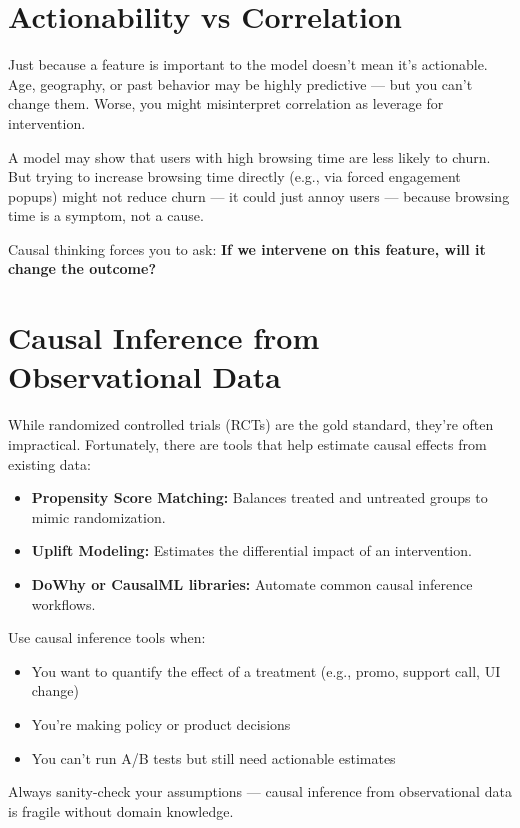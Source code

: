 \documentclass[12pt,openany, draft]{book}
\begin{document}
\section{Actionability vs Correlation}

Just because a feature is important to the model doesn't mean it's actionable. Age, geography, or past behavior may be highly predictive — but you can’t change them. Worse, you might misinterpret correlation as leverage for intervention.

\begin{examplebox}
A model may show that users with high browsing time are less likely to churn. But trying to increase browsing time directly (e.g., via forced engagement popups) might not reduce churn — it could just annoy users — because browsing time is a symptom, not a cause.
\end{examplebox}

Causal thinking forces you to ask: \textbf{If we intervene on this feature, will it change the outcome?}

\section{Causal Inference from Observational Data}

While randomized controlled trials (RCTs) are the gold standard, they’re often impractical. Fortunately, there are tools that help estimate causal effects from existing data:
\begin{itemize}
  \item \textbf{Propensity Score Matching:} Balances treated and untreated groups to mimic randomization.
  \item \textbf{Uplift Modeling:} Estimates the differential impact of an intervention.
  \item \textbf{DoWhy or CausalML libraries:} Automate common causal inference workflows.
\end{itemize}

Use causal inference tools when:
\begin{itemize}
  \item You want to quantify the effect of a treatment (e.g., promo, support call, UI change)
  \item You’re making policy or product decisions
  \item You can’t run A/B tests but still need actionable estimates
\end{itemize}

\begin{notebox}
Always sanity-check your assumptions — causal inference from observational data is fragile without domain knowledge.
\end{notebox}
\end{document}
